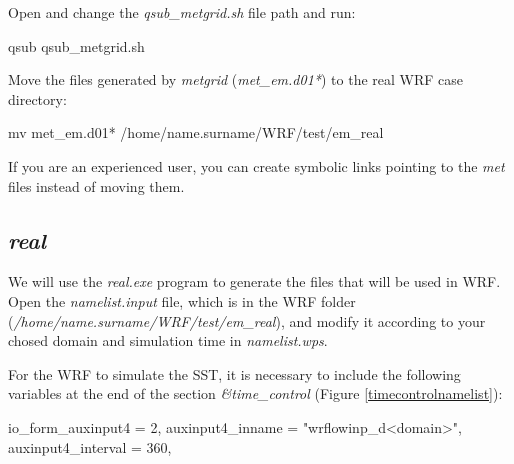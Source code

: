  Open and change the \textit{qsub\_metgrid.sh} file path and run:
\bigskip

\begin{bashcode}
qsub qsub_metgrid.sh
\end{bashcode}
\bigskip

 Move the files generated by \textit{metgrid} (\textit {met\_em.d01*}) to the real WRF case directory:
\bigskip

\begin{bashcode}
 mv met_em.d01* /home/name.surname/WRF/test/em_real
\end{bashcode}
\bigskip


\begin{tcolorbox}[enhanced,
    grow to left by=0cm,%
    grow to right by=0cm,%
    enlarge top by=0cm,%
    enlarge bottom by=0cm,%
    tcbox raise base,
    boxrule=1.0pt,
    left=18mm,
    colframe=green!50!black,coltext=green!25!black,colback=green!10!white,
    overlay={\begin{tcbclipinterior}\fill[green!75!blue!50!white] (frame.south west)
      rectangle node[text=white,font=\sffamily\bfseries\footnotesize,rotate=0] {NOTE} ([xshift=18mm]frame.north west);\end{tcbclipinterior}}]
If you are an experienced user, you can create symbolic links pointing to the \textit{met} files instead of moving them.
  \end{tcolorbox}
  \bigskip

\subsection{\textit{real}}\label{realsecao}
\bigskip

 We will use the \textit{real.exe} program to generate the files that will be used in WRF. Open the \textit{namelist.input} file, 
which is in the WRF folder (\textit{/home/name.surname/WRF/test/em\_real}), and modify it according to your chosed domain and simulation time in 
\textit{namelist.wps}.
\bigskip

 For the WRF to simulate the SST, it is necessary to include the following variables at the end of the section 
\textit{\&time\_control} (Figure \textcolor{bleu_cite}{\ref{timecontrolnamelist}}):
\bigskip

\begin{bashcode}
io_form_auxinput4  = 2,
auxinput4_inname   = "wrflowinp_d<domain>",
auxinput4_interval = 360,
\end{bashcode}
\bigskip

